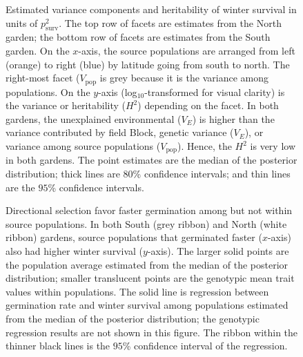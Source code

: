 \documentclass[
  12pt,
]{article}
\begin{document}
\begin{figure}[ht]
  \caption{Estimated variance components and heritability of winter survival in units of $p^2_\text{surv}$. The top row of facets are estimates from the North garden; the bottom row of facets are estimates from the South garden. On the $x$-axis, the source populations are arranged from left (orange) to right (blue) by latitude going from south to north. The right-most facet ($V_\text{pop}$ is grey because it is the variance among populations. On the $y$-axis (log$_{10}$-transformed for visual clarity) is the variance or heritability ($H^2$) depending on the facet. In both gardens, the unexplained environmental ($V_E$) is higher than the variance contributed by field Block, genetic variance ($V_E$), or variance among source populations ($V_\text{pop}$). Hence, the $H^2$ is very low in both gardens. The point estimates are the median of the posterior distribution; thick lines are $80$\% confidence intervals; and thin lines are the $95$\% confidence intervals.}
  \label{fig:h2-surv}
\end{figure}

\begin{figure}[ht]
  \caption{Directional selection favor faster germination among but not within source populations. In both South (grey ribbon) and North (white ribbon) gardens, source populations that germinated faster ($x$-axis) also had higher winter survival ($y$-axis). The larger solid points are the population average estimated from the median of the posterior distribution; smaller translucent points are the genotypic mean trait values within populations. The solid line is regression between germination rate and winter survival among populations estimated from the median of the posterior distribution; the genotypic regression results are not shown in this figure. The ribbon within the thinner black lines is the $95$\% confidence interval of the regression.}
  \label{fig:selection}
\end{figure}
\end{document}
